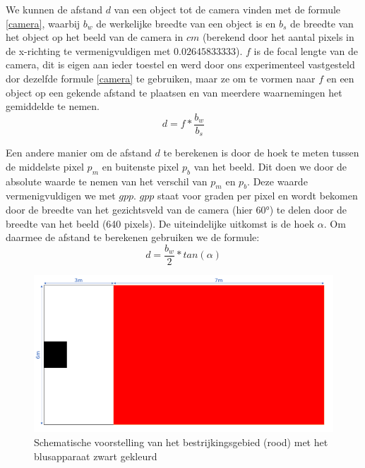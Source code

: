 \documentclass[kulak]{kulakarticle} %
\begin{document}
			We kunnen de afstand \(d\) van een object tot de camera vinden met de formule \ref{camera}, waarbij \(b_w\) de werkelijke breedte van een object is en \(b_s\) de breedte van het object op het beeld van de camera in \(cm\) (berekend door het aantal pixels in de x-richting te vermenigvuldigen met \(0.02645833333\)). \(f\) is de focal lengte van de camera, dit is eigen aan ieder toestel en werd door ons experimenteel vastgesteld dor dezelfde formule \ref{camera} te gebruiken, maar ze om te vormen naar \(f\) en een object op een gekende afstand te plaatsen en van meerdere waarnemingen het gemiddelde te nemen. 
				\begin{equation} \label{camera}
					d = f * \frac{b_w}{b_s}
				\end{equation}

			Een andere manier om de afstand \(d\) te berekenen is door de hoek te meten tussen de middelste pixel \(p_m\) en buitenste pixel \(p_b\) van het beeld. Dit doen we door de absolute waarde te nemen van het verschil van \(p_m\) en \(p_b\). Deze waarde vermenigvuldigen we met \(gpp\). \(gpp\) staat voor graden per pixel en wordt bekomen door de breedte van het gezichtsveld van de camera (hier 60°) te delen door de breedte van het beeld (640 pixels). De uiteindelijke uitkomst is de hoek \(\alpha\). Om daarmee de afstand te berekenen gebruiken we de formule:
				\begin{equation} \label{camera_2}
					d = \frac{b_w}{2} * tan(\alpha)
				\end{equation}
				
				\begin{figure} [h!]
					\centering                
					\includegraphics[width = .5 \textwidth]{schematische voorstelling bestrijkingsgebied LATEX}
					\caption{Schematische voorstelling van het bestrijkingsgebied (rood) met het blusapparaat zwart gekleurd}
					\label{bestrijkingsgebied}
				\end{figure}
\end{document}
